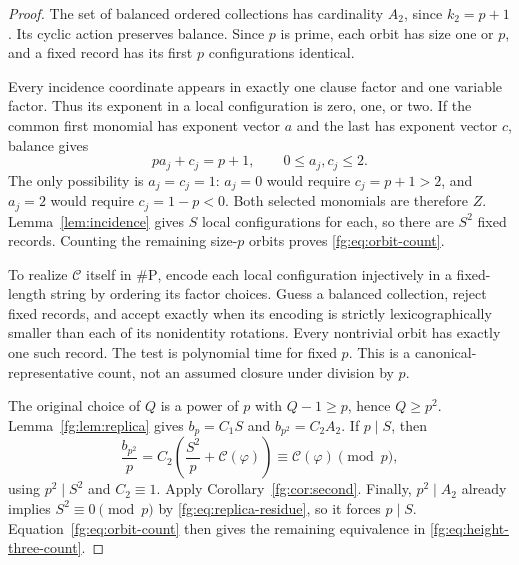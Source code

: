 \begin{proof}
The set of balanced ordered collections has cardinality $A_2$, since
$k_2=p+1$. Its cyclic action preserves balance. Since $p$ is prime,
each orbit has size one or $p$, and a fixed record has its first $p$
configurations identical.

Every incidence coordinate appears in exactly one clause factor and
one variable factor. Thus its exponent in a local configuration is
zero, one, or two. If the common first monomial has exponent vector
$a$ and the last has exponent vector $c$, balance gives
\[
 pa_j+c_j=p+1,\qquad 0\le a_j,c_j\le2.
\]
The only possibility is $a_j=c_j=1$: $a_j=0$ would require
$c_j=p+1>2$, and $a_j=2$ would require $c_j=1-p<0$.
Both selected monomials are therefore $Z$. Lemma~\ref{lem:incidence}
gives $S$ local configurations for each, so there are $S^2$ fixed
records. Counting the remaining size-$p$ orbits proves
\eqref{fg:eq:orbit-count}.

To realize $\mathcal C$ itself in $\#\mathrm P$, encode each local
configuration injectively in a fixed-length string by ordering its
factor choices. Guess a balanced collection, reject fixed records,
and accept exactly when its encoding is strictly lexicographically
smaller than each of its nonidentity rotations. Every nontrivial orbit
has exactly one such record. The test is polynomial time for fixed $p$.
This is a canonical-representative count, not an assumed closure under
division by $p$.

The original choice of $Q$ is a power of $p$ with $Q-1\ge p$, hence
$Q\ge p^2$. Lemma~\ref{fg:lem:replica} gives $b_p=C_1S$ and
$b_{p^2}=C_2A_2$. If $p\mid S$, then
\[
 \frac{b_{p^2}}p
 =C_2\left(\frac{S^2}p+\mathcal C(\varphi)\right)
 \equiv\mathcal C(\varphi)\pmod p,
\]
using $p^2\mid S^2$ and $C_2\equiv1$. Apply
Corollary~\ref{fg:cor:second}. Finally, $p^2\mid A_2$ already implies
$S^2\equiv0\pmod p$ by \eqref{fg:eq:replica-residue}, so it forces
$p\mid S$. Equation~\eqref{fg:eq:orbit-count} then gives the remaining
equivalence in \eqref{fg:eq:height-three-count}.
\end{proof}

